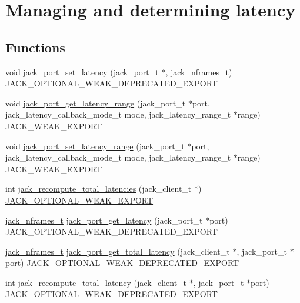 \hypertarget{group__LatencyFunctions}{\section{\-Managing and determining latency}
\label{d7/dc4/group__LatencyFunctions}
}
\subsection*{\-Functions}
\begin{DoxyCompactItemize}
\item 
void \hyperlink{group__LatencyFunctions_gaba121996f00bd96ceec5b1c1012fc767}{jack\-\_\-port\-\_\-set\-\_\-latency} (jack\-\_\-port\-\_\-t $\ast$, \hyperlink{types_8h_aa954df532e901ae5172e68a23f3da9b6}{jack\-\_\-nframes\-\_\-t}) \-J\-A\-C\-K\-\_\-\-O\-P\-T\-I\-O\-N\-A\-L\-\_\-\-W\-E\-A\-K\-\_\-\-D\-E\-P\-R\-E\-C\-A\-T\-E\-D\-\_\-\-E\-X\-P\-O\-R\-T
\item 
void \hyperlink{group__LatencyFunctions_gaf379bc0e88a6df6c4b7836db4b9382d7}{jack\-\_\-port\-\_\-get\-\_\-latency\-\_\-range} (jack\-\_\-port\-\_\-t $\ast$port, jack\-\_\-latency\-\_\-callback\-\_\-mode\-\_\-t mode, jack\-\_\-latency\-\_\-range\-\_\-t $\ast$range) \-J\-A\-C\-K\-\_\-\-W\-E\-A\-K\-\_\-\-E\-X\-P\-O\-R\-T
\item 
void \hyperlink{group__LatencyFunctions_ga7a8f181fcec32945db7b8e06ee1ca94b}{jack\-\_\-port\-\_\-set\-\_\-latency\-\_\-range} (jack\-\_\-port\-\_\-t $\ast$port, jack\-\_\-latency\-\_\-callback\-\_\-mode\-\_\-t mode, jack\-\_\-latency\-\_\-range\-\_\-t $\ast$range) \-J\-A\-C\-K\-\_\-\-W\-E\-A\-K\-\_\-\-E\-X\-P\-O\-R\-T
\item 
int \hyperlink{group__LatencyFunctions_ga46400b9a573389549784a356ab2d4e3b}{jack\-\_\-recompute\-\_\-total\-\_\-latencies} (jack\-\_\-client\-\_\-t $\ast$) \hyperlink{weakmacros_8h_adf1bde0dd996bbf61a44311165014dd1}{\-J\-A\-C\-K\-\_\-\-O\-P\-T\-I\-O\-N\-A\-L\-\_\-\-W\-E\-A\-K\-\_\-\-E\-X\-P\-O\-R\-T}
\item 
\hyperlink{types_8h_aa954df532e901ae5172e68a23f3da9b6}{jack\-\_\-nframes\-\_\-t} \hyperlink{group__LatencyFunctions_ga47fa957309f9b3111010284e10cc1de0}{jack\-\_\-port\-\_\-get\-\_\-latency} (jack\-\_\-port\-\_\-t $\ast$port) \-J\-A\-C\-K\-\_\-\-O\-P\-T\-I\-O\-N\-A\-L\-\_\-\-W\-E\-A\-K\-\_\-\-D\-E\-P\-R\-E\-C\-A\-T\-E\-D\-\_\-\-E\-X\-P\-O\-R\-T
\item 
\hyperlink{types_8h_aa954df532e901ae5172e68a23f3da9b6}{jack\-\_\-nframes\-\_\-t} \hyperlink{group__LatencyFunctions_ga7f5835f17cb55a5ed64bb63cb18c462c}{jack\-\_\-port\-\_\-get\-\_\-total\-\_\-latency} (jack\-\_\-client\-\_\-t $\ast$, jack\-\_\-port\-\_\-t $\ast$port) \-J\-A\-C\-K\-\_\-\-O\-P\-T\-I\-O\-N\-A\-L\-\_\-\-W\-E\-A\-K\-\_\-\-D\-E\-P\-R\-E\-C\-A\-T\-E\-D\-\_\-\-E\-X\-P\-O\-R\-T
\item 
int \hyperlink{group__LatencyFunctions_ga56372ab81d673cc4a419fd04cd3bfb8a}{jack\-\_\-recompute\-\_\-total\-\_\-latency} (jack\-\_\-client\-\_\-t $\ast$, jack\-\_\-port\-\_\-t $\ast$port) \-J\-A\-C\-K\-\_\-\-O\-P\-T\-I\-O\-N\-A\-L\-\_\-\-W\-E\-A\-K\-\_\-\-D\-E\-P\-R\-E\-C\-A\-T\-E\-D\-\_\-\-E\-X\-P\-O\-R\-T
\end{DoxyCompactItemize}


